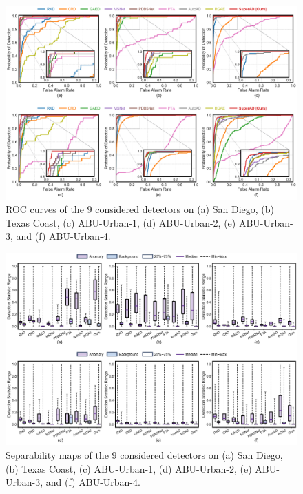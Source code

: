 \begin{figure}[htbp]
  \centering
  \includegraphics[width=1\linewidth]{Figures/PDF/roc_all.pdf}
  \caption{ROC curves of the 9 considered detectors on (a) San Diego, (b) Texas Coast, (c) ABU-Urban-1, (d) ABU-Urban-2, (e) ABU-Urban-3, and (f) ABU-Urban-4.}
  \label{fig:cmp-all-models-roc}
\end{figure}

\begin{figure}[htbp]
    \centering
    \includegraphics[width=1\linewidth]{Figures/PDF/box_all.pdf}
    \caption{Separability maps of the 9 considered detectors on (a) San Diego, (b) Texas Coast, (c) ABU-Urban-1, (d) ABU-Urban-2, (e) ABU-Urban-3, and (f) ABU-Urban-4.}
    \label{fig:cmp-all-models-box}
  \end{figure}
  



